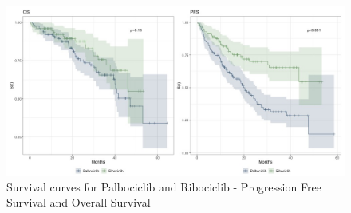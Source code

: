 

\begin{figure}[ht]
  \caption{Survival curves for Palbociclib and Ribociclib - Progression Free Survival and Overall Survival}\label{fig:interest} 
  \includegraphics[scale=0.4]{figures/interest_curve_both.jpeg}%

\end{figure}


